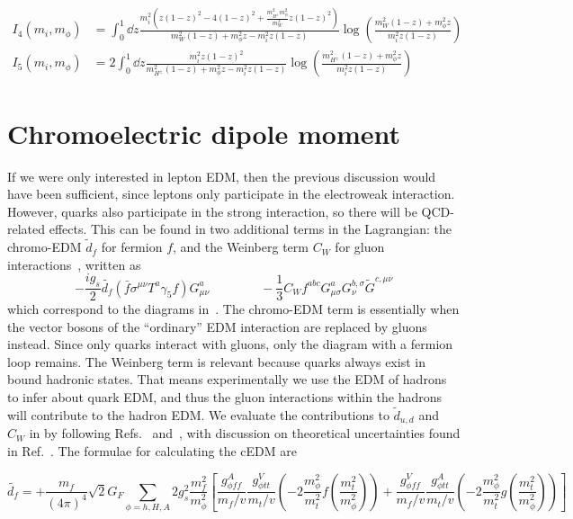 \begin{adjustwidth}{-2.5cm}{-2.5cm}
	\begin{align}
	I_{4}(m_{i}, m_{\phi}) &= \int_0^1 \dd{z} \frac{m_i^2\left(z(1-z)^2-4(1-z)^2+\frac{m_{H^{\pm}}^{2}m_\phi^2}{m_W^2} z(1-z)^2\right)}{m_W^2(1-z)+m_\phi^2 z-m_i^2 z(1-z)} \log \left(\frac{m_W^2(1-z)+m_\phi^2 z}{m_i^2 z(1-z)}\right)\\
	I_{5}(m_{i}, m_{\phi}) &= 2 \int_0^1 \dd{z} \frac{m_i^2 z(1-z)^2}{m_{H^{\pm}}^2(1-z)+m_\phi^2 z-m_i^2 z(1-z)} \log \left(\frac{m_{H^{\pm}}^2(1-z)+m_\phi^2 z}{m_i^2 z(1-z)}\right)
	\end{align}
\end{adjustwidth}

\section{Chromoelectric dipole moment}
If we were only interested in lepton EDM, then the previous discussion would have been sufficient, since leptons only participate in the electroweak interaction.
However, quarks also participate in the strong interaction, so there will be QCD-related effects.
This can be found in two additional terms in the Lagrangian: 
the chromo-EDM \(\tilde{d}_{f} \) for fermion \(f \), and the Weinberg term \(C_{W} \) for gluon interactions~\cite{Weinberg1989Gluon}, written as
\begin{equation}
  -\frac{i g_{s}}{2}\tilde{d_{f}}\left(\bar{f}\sigma^{\mu\nu}T^{a}\gamma_{5}f\right)G^{a}_{\mu\nu}\quad \qquad \quad -\frac{1}{3}C_Wf^{abc}G^{a}_{\mu\sigma}G^{b,\sigma}_{\nu}\tilde{G}^{c,\mu\nu}
\end{equation}
which correspond to the diagrams in~.
The chromo-EDM term is essentially when the vector bosons of the ``ordinary'' EDM interaction are replaced by gluons instead.
Since only quarks interact with gluons, only the diagram with a fermion loop remains.
The Weinberg term is relevant because quarks always exist in bound hadronic states.
That means experimentally we use the EDM of hadrons to infer about quark EDM, and thus the gluon interactions within the hadrons will contribute to the hadron EDM.
We evaluate the contributions to \(\tilde{d}_{u, d} \) and \(C_{W} \) in {\gthdm} by following Refs.~\cite{Abe2016EDM} and~\cite{JungPich2014CEDM}, with discussion on theoretical uncertainties found in Ref.~\cite{KanetaEtAl2023CEDMUncertainties}.
The formulae for calculating the cEDM are

\begin{adjustwidth}{-2cm}{-1.5cm}
	\begin{equation}
	\tilde{d_{f}} = +\frac{m_{f}}{(4\pi)^{4}}\sqrt{2}G_{F}\sum_{\phi=h,H,A}2g_{s}^{2}\frac{m_{f}^{2}}{m_{\phi}^{2}}
	\left[\frac{g_{\phi ff}^{A}}{m_{f}/v}\frac{g_{\phi tt}^{V}}{m_{t}/v}\left(-2\frac{m_{\phi}^{2}}{m_{t}^{2}} f\left(\frac{m_{t}^{2}}{m_{\phi}^{2}}\right)\right) 
	+ \frac{g_{\phi ff}^{V}}{m_{f}/v}\frac{g_{\phi tt}^{A}}{m_{t}/v}\left(-2\frac{m_{\phi}^{2}}{m_{t}^{2}} g\left(\frac{m_{t}^{2}}{m_{\phi}^{2}}\right)\right)\right]
	\end{equation}
\end{adjustwidth}


